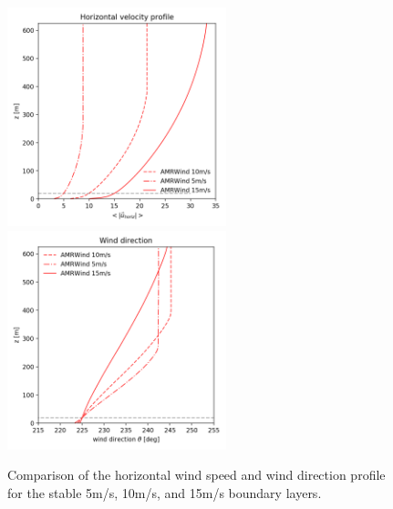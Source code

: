 \begin{figure}[hbt!]
  \centering
  \includegraphics[width=2.5in]{figures/AMRWind_allWS/AMRWind_stable_WS.png}
  \includegraphics[width=2.5in]{figures/AMRWind_allWS/AMRWind_stable_WDir.png}
  \caption{ \label{fig:CompareAMRallWS} Comparison of the horizontal
    wind speed and wind direction profile for the stable 5m/s, 10m/s,
    and 15m/s boundary layers. }
\end{figure}

